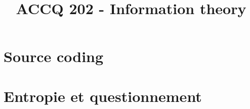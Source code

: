 \documentclass[a4paper,9pt]{article}
\title{\vspace{-1.2cm} ACCQ 202 - Information theory}
\date{}
\begin{document}
\maketitle

\vspace{-1.5cm}

\section{Source coding}

	

\section{Entropie et questionnement}

	
\end{document}
